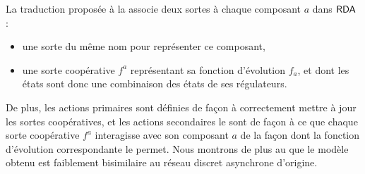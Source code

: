 La traduction proposée à la 
associe deux sortes à chaque composant $a$ dans $\mathsf{RDA}$ :
\begin{itemize}
  \item une sorte du même nom pour représenter ce composant,
  \item une sorte coopérative $f^a$ représentant sa fonction d'évolution $f_a$,
    et dont les états sont donc une combinaison des états de ses régulateurs.
\end{itemize}
De plus, les actions primaires sont définies de façon à correctement mettre à jour
les sortes coopératives,
et les actions secondaires le sont de façon à ce que chaque sorte coopérative $f^a$
interagisse avec son composant $a$ de la façon dont la fonction d'évolution
correspondante le permet.
Nous montrons de plus au  que le modèle obtenu
est faiblement bisimilaire au réseau discret asynchrone d'origine.


